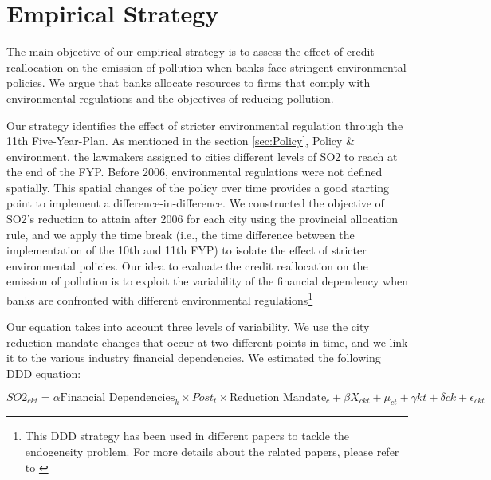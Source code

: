 \documentclass[12pt]{article}
\begin{document}
\section{Empirical Strategy} \label{sec:Empirical}

The main objective of our empirical strategy is to assess the effect of credit reallocation on the emission of pollution when banks face stringent environmental policies. We argue that banks allocate resources to firms that comply with environmental regulations and the objectives of reducing pollution.

Our strategy identifies the effect of stricter environmental regulation through the 11th Five-Year-Plan. As mentioned in the section \ref{sec:Policy}, Policy \& environment, the lawmakers assigned to cities different levels of SO2 to reach at the end of the FYP. Before 2006, environmental regulations were not defined spatially. This spatial changes of the policy over time provides a good starting point to implement a difference-in-difference. We constructed the objective of SO2's reduction to attain after 2006 for each city using the provincial allocation rule, and we apply the time break (i.e., the time difference between the implementation of the 10th and 11th FYP) to isolate the effect of stricter environmental policies. Our idea to evaluate the credit reallocation on the emission of pollution is to exploit the variability of the financial dependency when banks are confronted with different environmental regulations\footnote{This DDD strategy has been used in different papers to tackle the endogeneity problem. For more details about the related papers, please refer to \cite{Hering2014-af, Cai2016-br, Chen2018-ki, Shi2018-zk}}

Our equation takes into account three levels of variability. We use the city reduction mandate changes that occur at two different points in time, and we link it to the various industry financial dependencies. We estimated the following DDD equation: 

\begin{equation} \label{eq:main}
SO2_{ckt} = \alpha\text{Financial Dependencies}_{k} \times Post_{t} \times \text{Reduction Mandate}_{c} + \beta X_{ckt} + \mu_{ct} + \gamma{kt} + \delta{ck} + \epsilon_{ckt}
\end{equation}
\end{document}
